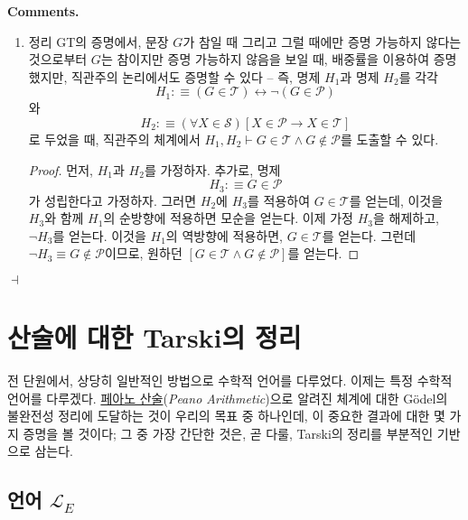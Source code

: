 \documentclass[12pt]{paper}
\newenvironment{context}[1][]{\noindent \textbf{{#1}.}}{\hfill $ \dashv $}
\begin{document}
  \begin{context}[Comments]
    \begin{enumerate}
      \item 정리 GT의 증명에서,
      문장 $G$가 참일 때 그리고 그럴 때에만 증명 가능하지 않다는 것으로부터 $G$는 참이지만 증명 가능하지 않음을 보일 때,
      배중률을 이용하여 증명했지만, 직관주의 논리에서도 증명할 수 있다 --
      즉, 명제 $H_{1}$과 명제 $H_{2}$를 각각
      $$H_{1} : \equiv \left( G \in \mathcal{T} \right) \leftrightarrow \lnot \left( G \in \mathcal{P} \right) $$와
      $$ H_{2} : \equiv \left( \forall X \in \mathcal{S} \right) \left[ X \in \mathcal{P} \rightarrow X \in \mathcal{T} \right]$$로
      두었을 때,
      직관주의 체계에서 $H_{1} , H_{2} \vdash G \in \mathcal{T} \land G \notin \mathcal{P}$를 도출할 수 있다.

      \begin{proof}
        먼저, $H_{1}$과 $H_{2}$를 가정하자.
        추가로, 명제 $$H_{3} : \equiv G \in \mathcal{P}$$가 성립한다고 가정하자.
        그러면 $H_{2}$에 $H_{3}$를 적용하여 $G \in \mathcal{T}$를 얻는데,
        이것을 $H_{3}$와 함께 $H_{1}$의 순방향에 적용하면 모순을 얻는다.
        이제 가정 $H_{3}$을 해제하고, $\lnot H_{3}$를 얻는다.
        이것을 $H_{1}$의 역방향에 적용하면, $G \in \mathcal{T}$를 얻는다.
        그런데 $\lnot H_{3} \equiv G \notin \mathcal{P}$이므로,
        원하던 $\left[ G \in \mathcal{T} \land G \notin \mathcal{P} \right]$를 얻는다.
      \end{proof}
    \end{enumerate}
  \end{context}

  \section{산술에 대한 Tarski의 정리}
  \hspace{12pt}

  전 단원에서, 상당히 일반적인 방법으로 수학적 언어를 다루었다.
  이제는 특정 수학적 언어를 다루겠다.
  \underline{페아노 산술}(\textit{Peano Arithmetic})으로 알려진 체계에 대한
  G\"odel의 불완전성 정리에 도달하는 것이 우리의 목표 중 하나인데,
  이 중요한 결과에 대한 몇 가지 증명을 볼 것이다;
  그 중 가장 간단한 것은, 곧 다룰, Tarski의 정리를 부분적인 기반으로 삼는다.

  \subsection{언어 $\mathcal{L}_{E}$}
  \hspace{12pt}
\end{document}
